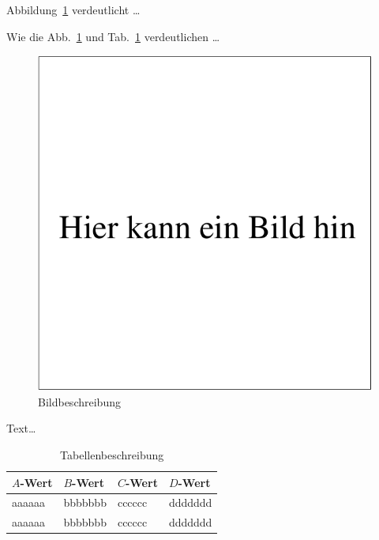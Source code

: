 \documentclass[bachelor,       %
               twoside,        %
               BCOR10mm,       %
               english,ngerman, %
               ]{GAUBM}
\begin{document}
Abbildung~\ref{fig:bildplatzhalter} verdeutlicht \dots

Wie die Abb.~\ref{fig:bildplatzhalter} und
Tab.~\ref{tab:tabellenplatzhalter} verdeutlichen \dots

\begin{figure}
  \centering
  \includegraphics[width=0.5\linewidth]{figures/bild}
  \caption{Bildbeschreibung}
  \label{fig:bildplatzhalter}
\end{figure}

Text\dots
\begin{table}
  \centering
  \begin{tabular}{llll}
    \toprule
    $A$-Wert&$B$-Wert&$C$-Wert&$D$-Wert\\
    \midrule
    aaaaaa&bbbbbbb&cccccc&ddddddd\\
    aaaaaa&bbbbbbb&cccccc&ddddddd\\
    \bottomrule
  \end{tabular}
  \caption{Tabellenbeschreibung}
  \label{tab:tabellenplatzhalter}
\end{table}



\cleardoublepage



\end{document}
